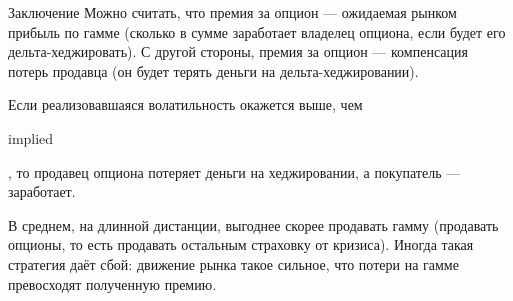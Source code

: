 \documentclass{beamer}
\newcommand{\en}[1]{\begin{otherlanguage}{english}#1\end{otherlanguage}}
\begin{document}
\begin{frame}{Заключение}
\justify
Можно считать, что премия за опцион --- ожидаемая рынком прибыль по гамме (сколько в 
сумме заработает владелец опциона, если будет его дельта-хеджировать). С другой 
стороны, премия за опцион --- компенсация потерь продавца (он будет терять деньги на дельта-хеджировании).

\justify
Если реализовавшаяся волатильность окажется выше, чем \en{implied}, то продавец опциона
потеряет деньги на хеджировании, а покупатель --- заработает.

\justify
В среднем, на длинной дистанции, выгоднее скорее продавать гамму (продавать опционы, то
есть продавать остальным страховку от кризиса). Иногда такая стратегия даёт сбой: 
движение рынка такое сильное, что потери на гамме превосходят полученную премию. 
\end{frame}
\end{document}
